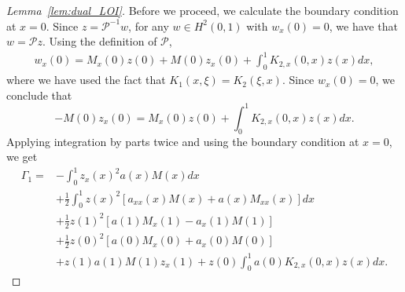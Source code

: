 \documentclass[US letter, 9 pt, conference]{ieeeconf}  \usepackage{setspace}
\newcommand{\igzo}{\int_0^1}
\newcommand{\pop}{\mathcal{P}}
\newcommand{\pinv}{\mathcal{P}^{-1}}
\begin{document}
\begin{proof}[Lemma~\ref{lem:dual_LOI}]
Before we proceed, we calculate the boundary condition at $x=0$. Since $z=\pinv w$, for any $w\in H^2(0,1)$ with $w_x(0)=0$, we have that $w=\pop z$. Using the definition of $\pop$,
\begin{align*}
w_x(0)=M_x(0)z(0)+M(0)z_x(0)+\igzo K_{2,x}(0,x)z(x)dx,
\end{align*} where we have used the fact that $K_1(x,\xi)=K_2(\xi,x)$. Since $w_x(0)=0$, we conclude that
\begin{equation}\label{eqn:dual:BC}
-M(0)z_x(0)=M_x(0)z(0)+\igzo K_{2,x}(0,x)z(x)dx.
\end{equation} Applying integration by parts twice and using the boundary condition at $x=0$, we get
\begin{align*}
\Gamma_1 =& -\igzo z_x(x)^2 a(x)M(x)dx \\
&+ \frac{1}{2}\igzo z(x)^2 \left[a_{xx}(x)M(x)+a(x)M_{xx}(x) \right]dx \\
&+ \frac{1}{2}z(1)^2 \left[a(1)M_x(1)-a_x(1)M(1) \right] \\
&+ \frac{1}{2} z(0)^2 \left[a(0)M_x(0)+a_x(0)M(0) \right] \\
&+z(1)a(1)M(1)z_x(1)+z(0)\igzo a(0)K_{2,x}(0,x)z(x)dx.
\end{align*}
 

\end{proof}
\end{document}
